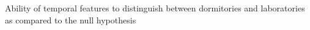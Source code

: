 Ability of temporal features to distinguish between dormitories and laboratories as compared to the null hypothesis
\label{sec:labsvsdorms_nullhypth}